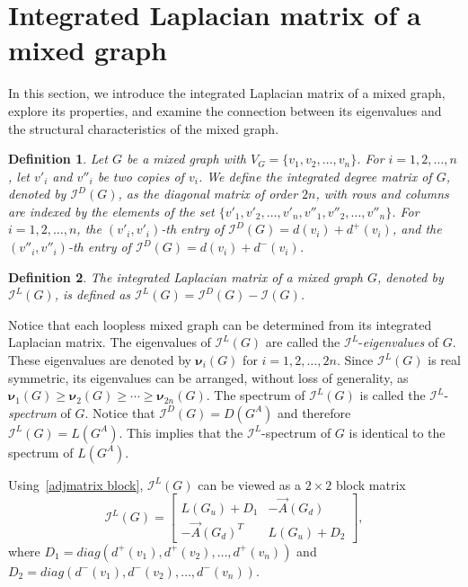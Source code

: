 \documentclass[12pt]{article}
\numberwithin{equation}{section}
\newtheorem{defn}{Definition}[section]
\begin{document}


	
\section{Integrated Laplacian matrix of a mixed graph}\label{S4}
In this section, we introduce the integrated Laplacian matrix of a mixed graph, explore its properties, and examine the connection between its eigenvalues and the structural characteristics of the mixed graph.
	\begin{defn}\normalfont
		Let $G$ be a mixed graph with $V_G=\{v_1,v_2,\ldots,v_n\}$. For $i=1,2,\ldots,n$, let $v'_i$ and $v''_i$ be two copies of $v_i$. We define the \textit{integrated degree matrix} of $G$, denoted by $\mathcal{I}^D(G)$, as the diagonal matrix of order $2n$, with rows and columns are indexed by the elements of the set $\{v'_1,v'_2,\ldots,v'_n,v''_1,v''_2,\ldots,v''_n\}$.
		For $i=1,2,\ldots,n$,
		the $(v'_i,v'_i)$-th entry of $\mathcal{I}^D(G)=
		d(v_i)+d^{+}(v_i)$, and
		the $(v''_i,v''_i)$-th entry of $\mathcal{I}^D(G)=
		d(v_i)+d^{-}(v_i)$.
	\end{defn}
	
	\begin{defn}\normalfont
		The \textit{integrated Laplacian matrix} of a mixed graph $G$, denoted by $\mathcal{I}^L(G)$, is defined as $\mathcal{I}^L(G)=\mathcal{I}^D(G)-\mathcal{I}(G)$.
	\end{defn}
Notice that each loopless mixed graph can be determined from its integrated Laplacian matrix. The eigenvalues of $\mathcal{I}^L(G)$ are called the $\mathcal{I}^L$-\textit{eigenvalues} of $G$. These eigenvalues are denoted by $\bm{\nu}_i(G)$ for $i=1,2,\ldots,2n$. Since $\mathcal{I}^L(G)$ is real symmetric, its eigenvalues can be arranged, without loss of generality, as $\bm{\nu}_1(G)\geq\bm{\nu}_2(G)\geq\cdots\geq\bm{\nu}_{2n}(G)$.	The spectrum of $\mathcal{I}^L(G)$ is called the $\mathcal{I}^L$-\textit{spectrum} of $G$. Notice that $\mathcal{I}^D(G)=D(G^A)$ and therefore $\mathcal{I}^L(G)=L(G^A)$. This implies that the $\mathcal{I}^L$-spectrum of $G$ is identical to the spectrum of $L(G^A)$. 
	
	Using~\eqref{adjmatrix block}, $\mathcal{I}^L(G)$ can be viewed as a $2\times 2$ block matrix
	\begin{equation}\label{laplacianblock}
		\mathcal{I}^L(G)=\begin{bmatrix}
			L(G_u)+D_1 & -\vec{A}(G_d)\\
			-\vec{A}(G_d)^T & L(G_u)+D_2
		\end{bmatrix},
	\end{equation} 
	where $D_1=diag(d^+(v_1),d^+(v_2),\ldots,d^+(v_n))$ and $D_2=diag(d^-(v_1),d^-(v_2),\ldots,d^-(v_n))$. 
	
\end{document}

